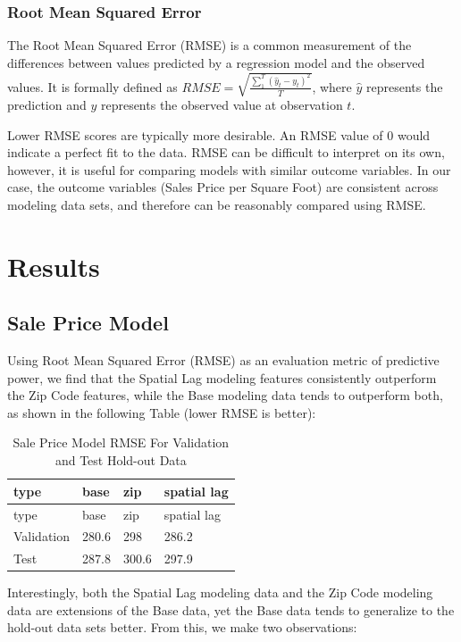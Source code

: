 \documentclass[]{article}
\begin{document}
\subsubsection{Root Mean Squared Error}\label{root-mean-squared-error}

The Root Mean Squared Error (RMSE) is a common measurement of the
differences between values predicted by a regression model and the
observed values. It is formally defined as
\(RMSE = \sqrt{ \frac{\sum_{1}^{T} (\hat{y}_t - y_t)^2}{T} }\), where
\(\hat{y}\) represents the prediction and \(y\) represents the observed
value at observation \(t\).

Lower RMSE scores are typically more desirable. An RMSE value of 0 would
indicate a perfect fit to the data. RMSE can be difficult to interpret
on its own, however, it is useful for comparing models with similar
outcome variables. In our case, the outcome variables (Sales Price per
Square Foot) are consistent across modeling data sets, and therefore can
be reasonably compared using RMSE.

\section{Results}\label{results}

\subsection{Sale Price Model}\label{sale-price-model}

Using Root Mean Squared Error (RMSE) as an evaluation metric of
predictive power, we find that the Spatial Lag modeling features
consistently outperform the Zip Code features, while the Base modeling
data tends to outperform both, as shown in the following Table (lower
RMSE is better):

\begin{longtable}[]{@{}llll@{}}
\caption{Sale Price Model RMSE For Validation and Test Hold-out
Data}\tabularnewline
\toprule
type & base & zip & spatial lag\tabularnewline
\midrule
\endfirsthead
\toprule
type & base & zip & spatial lag\tabularnewline
\midrule
\endhead
Validation & 280.6 & 298 & 286.2\tabularnewline
Test & 287.8 & 300.6 & 297.9\tabularnewline
\bottomrule
\end{longtable}

Interestingly, both the Spatial Lag modeling data and the Zip Code
modeling data are extensions of the Base data, yet the Base data tends
to generalize to the hold-out data sets better. From this, we make two
observations:
\end{document}
